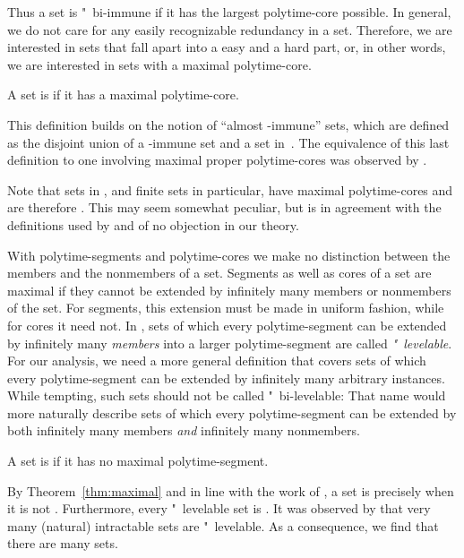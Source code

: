 Thus a set is "~bi-immune if it has the largest polytime-core possible.
In general, we do not care for any easily recognizable redundancy in a set.
Therefore, we are interested in sets that fall apart into a easy and a hard part, or, in other words, we are interested in sets with a maximal polytime-core.
\begin{definition}
  A set is  if it has a maximal polytime-core.
\end{definition}
This definition builds on the notion of \enquote{almost -immune} sets, which are defined as the disjoint union of a -immune set and a set in~.
The equivalence of this last definition to one involving maximal proper polytime-cores was observed by \textcite{orponen1986classification}.

Note that sets in , and finite sets in particular, have maximal polytime-cores and are therefore .
This may seem somewhat peculiar, but is in agreement with the definitions used by \textcite{orponen1986classification} and of no objection in our theory.

With polytime-segments and polytime-cores we make no distinction between the members and the nonmembers of a set.
Segments as well as cores of a set are maximal if they cannot be extended by infinitely many members or nonmembers of the set.
For segments, this extension must be made in uniform fashion, while for cores it need not.
In \parencite{orponen1985polynomial,orponen1986optimal}, sets of which every polytime-segment can be extended by infinitely many \emph{members} into a larger polytime-segment are called \emph{"~levelable}.
For our analysis, we need a more general definition that covers sets of which every polytime-segment can be extended by infinitely many arbitrary instances.
While tempting, such sets should not be called "~bi-levelable:
That name would more naturally describe sets of which every polytime-segment can be extended by both infinitely many members \emph{and} infinitely many nonmembers.
\begin{definition}
  A set is  if it has no maximal polytime-segment.
\end{definition}
By Theorem~\ref{thm:maximal} and in line with the work of \textcite{orponen1985polynomial}, a set is  precisely when it is not .
Furthermore, every "~levelable set is .
It was observed by \textcite{orponen1986optimal} that very many (natural) intractable sets are "~levelable.
As a consequence, we find that there are many  sets.

